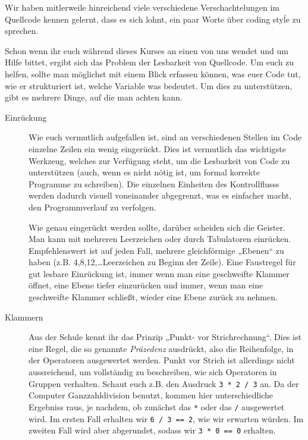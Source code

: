 
Wir haben mitlerweile hinreichend viele verschiedene Verschachtelungen im
Quellcode kennen gelernt, dass es sich lohnt, ein paar Worte über coding styĺe
zu sprechen.

Schon wenn ihr euch während dieses Kurses an einen von uns wendet und um Hilfe
bittet, ergibt sich das Problem der Lesbarkeit von Quellcode. Um euch zu
helfen, sollte man möglichst mit einem Blick erfassen können, was euer Code
tut, wie er strukturiert ist, welche Variable was bedeutet. Um dies zu
unterstützen, gibt es mehrere Dinge, auf die man achten kann.

\begin{description}
    \item[Einrückung]
        Wie euch vermutlich aufgefallen ist, sind an verschiedenen Stellen im
        Code einzelne Zeilen ein wenig eingerückt. Dies ist vermutlich das
        wichtigste Werkzeug, welches zur Verfügung steht, um die Lesbarkeit von
        Code zu unterstützen (auch, wenn es nicht nötig ist, um formal korrekte
        Programme zu schreiben). Die einzelnen Einheiten des Kontrollflusss
        werden dadurch visuell voneinander abgegrenzt, was es einfacher macht,
        den Programmverlauf zu verfolgen.

        Wie genau eingerückt werden sollte, darüber scheiden sich die Geister.
        Man kann mit mehreren Leerzeichen oder durch Tabulatoren einrücken.
        Empfehlenswert ist auf jeden Fall, mehrere gleichförmige „Ebenen“ zu
        haben (z.B. 4,8,12,\dots Leerzeichen zu Beginn der Zeile). Eine
        Faustregel für gut lesbare Einrückung ist, immer wenn man eine
        geschweifte Klammer öffnet, eine Ebene tiefer einzurücken und immer,
        wenn man eine geschweifte Klammer schließt, wieder eine Ebene zurück zu
        nehmen.
    \item[Klammern]
        Aus der Schule kennt ihr das Prinzip „Punkt- vor Strichrechnung“. Dies
        ist eine Regel, die so genannte \emph{Präzedenz} ausdrückt, also die
        Reihenfolge, in der Operatoren ausgewertet werden. Punkt vor Strich ist
        allerdings nicht aussreichend, um vollständig zu beschreiben, wie sich
        Operatoren in Gruppen verhalten. Schaut euch z.B. den Ausdruck
        \texttt{3 * 2 / 3} an. Da der Computer Ganzzahldivision benutzt, kommen
        hier unterschiedliche Ergebniss raus, je nachdem, ob zunächst das
        \texttt{*} oder das \texttt{/} ausgewertet wird. Im ersten Fall
        erhalten wir \texttt{6 / 3 == 2}, wie wir erwarten würden. Im zweiten
        Fall wird aber abgerundet, sodass wir \texttt{3 * 0 == 0} erhalten.


\end{description}

